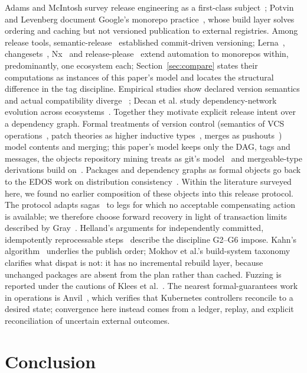 \documentclass[10pt,conference]{IEEEtran}
\theoremstyle{definition}
\newcommand{\G}[1]{G#1}
\begin{document}
Adams and McIntosh survey release engineering as a first-class
subject~\cite{adams}; Potvin and Levenberg document Google's monorepo
practice~\cite{potvin}, whose build layer solves ordering and caching
but not versioned publication to external registries.
Among release tools, semantic-release~\cite{semanticrelease}
established commit-driven versioning; Lerna~\cite{lerna},
changesets~\cite{changesets}, Nx~\cite{nx} and
release-please~\cite{releaseplease} extend automation to monorepos
within, predominantly, one ecosystem each; Section~\ref{sec:compare}
states their computations as instances of this paper's model and
locates the structural difference in the tag discipline. Empirical studies
show declared version semantics and actual compatibility diverge
~\cite{raemaekers,bogart}; Decan et al. study dependency-network evolution
across ecosystems~\cite{decan}. Together they motivate explicit release
intent over a dependency graph. Formal treatments of
version control (semantics of VCS operations~\cite{swierstraloh},
patch theories as higher inductive types~\cite{hpt}, merges as
pushouts~\cite{mimram}) model contents and merging; this paper's
model keeps only the DAG, tags and messages, the objects repository
mining treats as git's model~\cite{birdgit} and mergeable-type
derivations build on~\cite{mrdt}. Packages and
dependency graphs as formal objects go back to the EDOS work on
distribution consistency~\cite{edos}. Within the literature surveyed here,
we found no earlier composition of these objects into this release protocol.
The protocol adapts sagas~\cite{sagas} to legs for which no acceptable
compensating action is available; we therefore choose forward recovery in
light of transaction limits described by Gray~\cite{gray}. Helland's arguments for
independently committed, idempotently reprocessable
steps~\cite{helland07,helland12} describe the discipline
\G{2}--\G{6} impose. Kahn's algorithm~\cite{kahn} underlies the
publish order; Mokhov et al.'s build-system taxonomy~\cite{mokhov}
clarifies what dispat is not: it has no incremental rebuild layer,
because unchanged packages are absent from the plan rather than
cached. Fuzzing is reported under the cautions of Klees et
al.~\cite{klees}. The nearest formal-guarantees work in operations is
Anvil~\cite{anvil}, which verifies that Kubernetes controllers
reconcile to a desired state; convergence here instead comes from a ledger,
replay, and explicit reconciliation of uncertain external outcomes.

\section{Conclusion}
\label{sec:conclusion}
\end{document}
